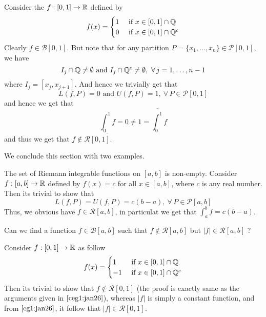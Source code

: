 \begin{cexample}\label{ceg1:jan26}
    Consider the  $f : [0,1] \to \mathbb{R}$ defined by 
    \[ f(x) = \begin{cases} 1 & \mbox{ if } x \in [0,1] \cap \mathbb{Q} \\ 0 & \mbox{ if } x \in [0,1] \cap \mathbb{Q}^c \end{cases} \]
    Clearly $f \in \mathcal{B}[0,1]$. But note that for any partition $P = \{x_1,\dots,x_n\} \in \mathcal{P}[0,1]$, we have \[ I_j \cap \mathbb{Q} \neq \emptyset \mbox{ and } I_j \cap \mathbb{Q}^c \neq \emptyset, \ \forall \, j = 1,\dots,n-1 \] where $I_j = [x_j,x_{j+1}]$. And hence we trivially get that \[ L(f,P) = 0 \mbox{ and } U(f,P) = 1, \ \forall \, P \in \mathcal{P}[0,1] \]
    and hence we get that 
    \[ \underline{\int_0^1 f} = 0 \neq 1 = \overline{\int_0^1} f \]
    and thus we get that $f \notin \mathcal{R}[0,1]$.
\end{cexample}
We conclude this section with two examples.
\begin{example}\label{eg1:jan26}
    The set of Riemann integrable functions on $[a,b]$ is non-empty. Consider $ f : [a,b] \to \mathbb{R}$ defined by $f(x) = c$ for all $x \in [a,b]$, where $c$ is any real number. Then its trivial to show that \[ L(f,P) = U(f,P) = c(b-a), \ \forall \, P \in \mathcal{P}[a,b] \]
    Thus, we obvious have $f \in \mathcal{R}[a,b]$, in particulat we get that $ \int_a^b f = c(b-a) $.
\end{example}

\begin{example}\label{eg2:jan26}
    Can we find a function $f \in \mathcal{B}[a,b]$ such that $f \notin \mathcal{R}[a,b]$ but $|f| \in \mathcal{R}[a,b]$ ?

    Consider $f : [0,1] \to \mathbb{R}$ as follow \[ f(x) = \begin{cases}
        1 & \mbox{ if } x \in [0,1] \cap \mathbb{Q} \\ -1 & \mbox{ if } x \in [0,1] \cap \mathbb{Q}^c
    \end{cases} \]
    Then its trivial to show that $f \notin \mathcal{R}[0,1]$ (the proof is exactly same as the arguments given in  $\ref{ceg1:jan26}$), whereas $|f|$ is simply a constant function, and from  $\ref{eg1:jan26}$, it follow that $|f| \in \mathcal{R}[0,1]$.
\end{example}